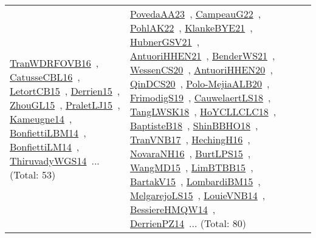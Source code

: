 {\begin{longtable}{lp{3cm}>{\raggedright\arraybackslash}p{6cm}>{\raggedright\arraybackslash}p{6cm}>{\raggedright\arraybackslash}p{8cm}}
\href{works/TranWDRFOVB16.pdf}{TranWDRFOVB16}~\cite{TranWDRFOVB16}, \href{works/CatusseCBL16.pdf}{CatusseCBL16}~\cite{CatusseCBL16}, \href{works/LetortCB15.pdf}{LetortCB15}~\cite{LetortCB15}, \href{works/Derrien15.pdf}{Derrien15}~\cite{Derrien15}, \href{works/ZhouGL15.pdf}{ZhouGL15}~\cite{ZhouGL15}, \href{works/PraletLJ15.pdf}{PraletLJ15}~\cite{PraletLJ15}, \href{works/Kameugne14.pdf}{Kameugne14}~\cite{Kameugne14}, \href{works/BonfiettiLBM14.pdf}{BonfiettiLBM14}~\cite{BonfiettiLBM14}, \href{works/BonfiettiLM14.pdf}{BonfiettiLM14}~\cite{BonfiettiLM14}, \href{works/ThiruvadyWGS14.pdf}{ThiruvadyWGS14}~\cite{ThiruvadyWGS14}... (Total: 53) & \href{works/PovedaAA23.pdf}{PovedaAA23}~\cite{PovedaAA23}, \href{works/CampeauG22.pdf}{CampeauG22}~\cite{CampeauG22}, \href{works/PohlAK22.pdf}{PohlAK22}~\cite{PohlAK22}, \href{works/KlankeBYE21.pdf}{KlankeBYE21}~\cite{KlankeBYE21}, \href{works/HubnerGSV21.pdf}{HubnerGSV21}~\cite{HubnerGSV21}, \href{works/AntuoriHHEN21.pdf}{AntuoriHHEN21}~\cite{AntuoriHHEN21}, \href{works/BenderWS21.pdf}{BenderWS21}~\cite{BenderWS21}, \href{works/WessenCS20.pdf}{WessenCS20}~\cite{WessenCS20}, \href{works/AntuoriHHEN20.pdf}{AntuoriHHEN20}~\cite{AntuoriHHEN20}, \href{works/QinDCS20.pdf}{QinDCS20}~\cite{QinDCS20}, \href{works/Polo-MejiaALB20.pdf}{Polo-MejiaALB20}~\cite{Polo-MejiaALB20}, \href{works/FrimodigS19.pdf}{FrimodigS19}~\cite{FrimodigS19}, \href{works/CauwelaertLS18.pdf}{CauwelaertLS18}~\cite{CauwelaertLS18}, \href{works/TangLWSK18.pdf}{TangLWSK18}~\cite{TangLWSK18}, \href{works/HoYCLLCLC18.pdf}{HoYCLLCLC18}~\cite{HoYCLLCLC18}, \href{works/BaptisteB18.pdf}{BaptisteB18}~\cite{BaptisteB18}, \href{works/ShinBBHO18.pdf}{ShinBBHO18}~\cite{ShinBBHO18}, \href{works/TranVNB17.pdf}{TranVNB17}~\cite{TranVNB17}, \href{works/HechingH16.pdf}{HechingH16}~\cite{HechingH16}, \href{works/NovaraNH16.pdf}{NovaraNH16}~\cite{NovaraNH16}, \href{works/BurtLPS15.pdf}{BurtLPS15}~\cite{BurtLPS15}, \href{works/WangMD15.pdf}{WangMD15}~\cite{WangMD15}, \href{works/LimBTBB15.pdf}{LimBTBB15}~\cite{LimBTBB15}, \href{works/BartakV15.pdf}{BartakV15}~\cite{BartakV15}, \href{works/LombardiBM15.pdf}{LombardiBM15}~\cite{LombardiBM15}, \href{works/MelgarejoLS15.pdf}{MelgarejoLS15}~\cite{MelgarejoLS15}, \href{works/LouieVNB14.pdf}{LouieVNB14}~\cite{LouieVNB14}, \href{works/BessiereHMQW14.pdf}{BessiereHMQW14}~\cite{BessiereHMQW14}, \href{works/DerrienPZ14.pdf}{DerrienPZ14}~\cite{DerrienPZ14}... (Total: 80)\\

\end{longtable}}
